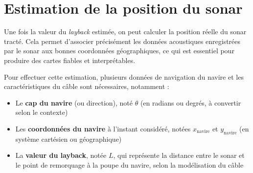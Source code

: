 \documentclass[12pt,a4paper]{report}
\begin{document}
\section{Estimation de la position du sonar}
\begin{figure}[H]
\end{figure}




Une fois la valeur du \textit{layback} estimée, on peut calculer la position réelle du sonar tracté. Cela permet d’associer précisément les données acoustiques enregistrées par le sonar aux bonnes coordonnées géographiques, ce qui est essentiel pour produire des cartes fiables et interprétables.

Pour effectuer cette estimation, plusieurs données de navigation du navire et les caractéristiques du câble sont nécessaires, notamment :

\begin{itemize}
  \item Le \textbf{cap du navire} (ou direction), noté $\theta$ (en radians ou degrés, à convertir selon le contexte)
  \item Les \textbf{coordonnées du navire} à l’instant considéré, notées $x_{\text{navire}}$ et $y_{\text{navire}}$ (en système cartésien ou géographique)
  \item La \textbf{valeur du layback}, notée $L$, qui représente la distance entre le sonar et le point de remorquage à la poupe du navire, selon la modélisation du câble
\end{itemize}
\end{document}
